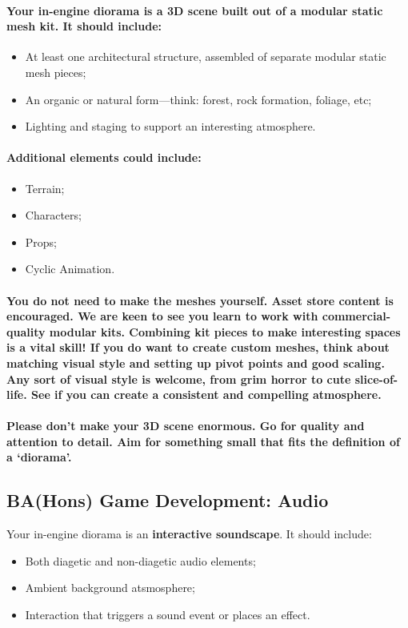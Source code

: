 \documentclass{../../fal_assignment}
\begin{document}
\paragraph{Your in-engine diorama is a \textbf{3D scene} built out of a modular static mesh kit. It should include:}
\begin{itemize}
\item At least one architectural structure, assembled of separate modular static mesh pieces;
\item An organic or natural form---think: forest, rock formation, foliage, etc;
\item Lighting and staging to support an interesting atmosphere.
\end{itemize}
\paragraph{Additional elements could include:}
\begin{itemize}
\item Terrain;
\item Characters;
\item Props; 
\item Cyclic Animation.
\end{itemize}
\paragraph{You do not need to make the meshes yourself. Asset store content is encouraged. We are keen to see you learn to work with commercial-quality modular kits. Combining kit pieces to make interesting spaces is a vital skill! If you do want to create custom meshes, think about matching visual style and setting up pivot points and good scaling. Any sort of visual style is welcome, from grim horror to cute slice-of-life. See if you can create a consistent and compelling atmosphere.}

\paragraph{Please don’t make your 3D scene enormous. Go for quality and attention to detail. Aim for something small that fits the definition of a ‘diorama’.}

\subsection*{BA(Hons) Game Development: Audio}

Your in-engine diorama is an \textbf{interactive soundscape}. It should include:
\begin{itemize}
\item Both diagetic and non-diagetic audio elements;
\item Ambient background atsmosphere; 
\item Interaction that triggers a sound event or places an effect.
\end{itemize}
\end{document}
